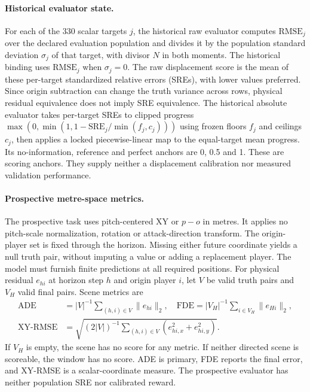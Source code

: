 \documentclass[10pt]{article}
\begin{document}
\paragraph{Historical evaluator state.}
For each of the 330 scalar targets $j$, the historical raw evaluator computes $\mathrm{RMSE}_j$ over the declared evaluation population and divides it by the population standard deviation $\sigma_j$ of that target, with divisor $N$ in both moments. The historical binding uses $\mathrm{RMSE}_j$ when $\sigma_j=0$. The raw displacement score is the mean of these per-target standardized relative errors (SREs), with lower values preferred. Since origin subtraction can change the truth variance across rows, physical residual equivalence does not imply SRE equivalence. The historical absolute evaluator takes per-target SREs to clipped progress $\max(0,\min(1,1-\mathrm{SRE}_j/\min(f_j,c_j)))$ using frozen floors $f_j$ and ceilings $c_j$, then applies a locked piecewise-linear map to the equal-target mean progress. Its no-information, reference and perfect anchors are 0, 0.5 and 1. These are scoring anchors. They supply neither a displacement calibration nor measured validation performance.

\paragraph{Prospective metre-space metrics.}
The prospective task uses pitch-centered XY or $p-o$ in metres. It applies no pitch-scale normalization, rotation or attack-direction transform. The origin-player set is fixed through the horizon. Missing either future coordinate yields a null truth pair, without imputing a value or adding a replacement player. The model must furnish finite predictions at all required positions. For physical residual $e_{hi}$ at horizon step $h$ and origin player $i$, let $V$ be valid truth pairs and $V_H$ valid final pairs. Scene metrics are
\begin{align}
 \mathrm{ADE}&=|V|^{-1}\sum_{(h,i)\in V}\lVert e_{hi}\rVert_2,\quad
 \mathrm{FDE}=|V_H|^{-1}\sum_{i\in V_H}\lVert e_{Hi}\rVert_2,\\
 \mathrm{XY\text{-}RMSE}&=\sqrt{(2|V|)^{-1}\sum_{(h,i)\in V}(e_{hi,x}^2+e_{hi,y}^2)}.
\end{align}
If $V_H$ is empty, the scene has no score for any metric. If neither directed scene is scoreable, the window has no score. ADE is primary, FDE reports the final error, and XY-RMSE is a scalar-coordinate measure. The prospective evaluator has neither population SRE nor calibrated reward.
\end{document}
